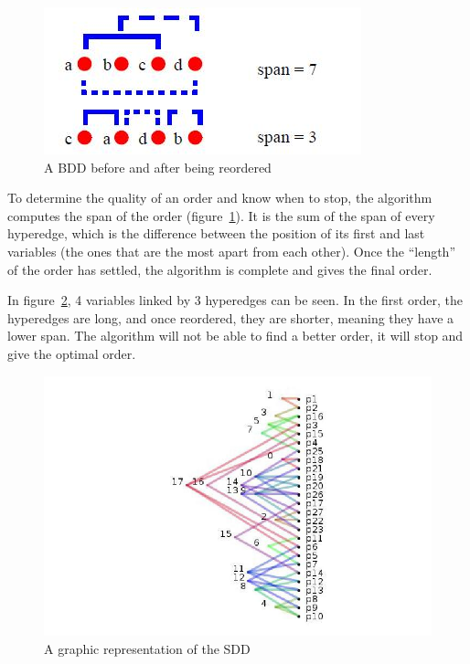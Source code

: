 \documentclass[12pt]{report}
\begin{document}
\begin{figure}[!h]
  \centering
  \includegraphics[scale=0.7]{images/force_span.jpg}
  \caption{A BDD before and after being reordered}
  \label{force_span}
\end{figure}

To determine the quality of an order and know when to stop, the algorithm computes the span of the order (figure~\ref{force_span}). It is the sum of the span of every hyperedge, which is the difference between the position of its first and last variables (the ones that are the most apart from each other). Once the \enquote{length} of the order has settled, the algorithm is complete and gives the final order.

In figure~\ref{order_graph}, 4 variables linked by 3 hyperedges can be seen. In the first order, the hyperedges are long, and once reordered, they are shorter, meaning they have a lower span. The algorithm will not be able to find a better order, it will stop and give the optimal order.

\begin{figure}[!h]
  \centering
  \includegraphics[scale=0.5]{images/representation_order.jpg}
  \caption{A graphic representation of the SDD}
  \label{order_graph}
\end{figure}
\end{document}
